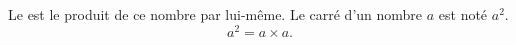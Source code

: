 Le  est le produit de ce nombre par lui-même.
Le carré d'un nombre $a$ est noté $a^2$.$$a^2=a\times a.$$